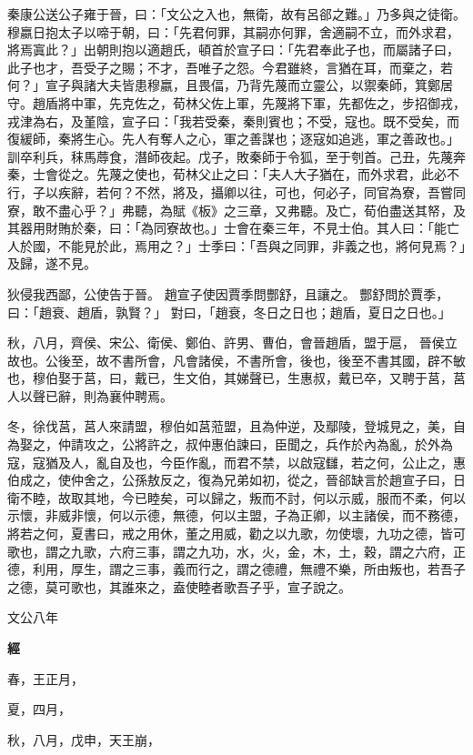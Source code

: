 \documentclass{ctexart}
\begin{document}
秦康公送公子雍于晉，曰：「文公之入也，無衛，故有呂郤之難。」乃多與之徒衛。穆嬴日抱太子以啼于朝，曰：「先君何罪，其嗣亦何罪，舍適嗣不立，而外求君，將焉寘此？」出朝則抱以適趙氏，頓首於宣子曰：「先君奉此子也，而屬諸子曰，此子也才，吾受子之賜；不才，吾唯子之怨。今君雖終，言猶在耳，而棄之，若何？」宣子與諸大夫皆患穆嬴，且畏偪，乃背先蔑而立靈公，以禦秦師，箕鄭居守。趙盾將中軍，先克佐之，荀林父佐上軍，先蔑將下軍，先都佐之，步招御戎，戎津為右，及堇陰，宣子曰：「我若受秦，秦則賓也；不受，寇也。既不受矣，而復緩師，秦將生心。先人有奪人之心，軍之善謀也；逐寇如追逃，軍之善政也。」訓卒利兵，秣馬蓐食，潛師夜起。戊子，敗秦師于令狐，至于刳首。己丑，先蔑奔秦，士會從之。先蔑之使也，荀林父止之曰：「夫人大子猶在，而外求君，此必不行，子以疾辭，若何？不然，將及，攝卿以往，可也，何必子，同官為寮，吾嘗同寮，敢不盡心乎？」弗聽，為賦《板》之三章，又弗聽。及亡，荀伯盡送其帑，及其器用財賄於秦，曰：「為同寮故也。」士會在秦三年，不見士伯。其人曰：「能亡人於國，不能見於此，焉用之？」士季曰：「吾與之同罪，非義之也，將何見焉？」及歸，遂不見。

狄侵我西鄙，公使告于晉。
趙宣子使因賈季問酆舒，且讓之。
酆舒問於賈季，曰：「趙衰、趙盾，孰賢？」
對曰，「趙衰，冬日之日也；趙盾，夏日之日也。」 

秋，八月，齊侯、宋公、衛侯、鄭伯、許男、曹伯，會晉趙盾，盟于扈，
晉侯立故也。公後至，故不書所會，凡會諸侯，不書所會，後也，後至不書其國，辟不敏也，穆伯娶于莒，曰，戴已，生文伯，其娣聲已，生惠叔，戴已卒，又聘于莒，莒人以聲已辭，則為襄仲聘焉。

冬，徐伐莒，莒人來請盟，穆伯如莒蒞盟，且為仲逆，及鄢陵，登城見之，美，自為娶之，仲請攻之，公將許之，叔仲惠伯諫曰，臣聞之，兵作於內為亂，於外為寇，寇猶及人，亂自及也，今臣作亂，而君不禁，以啟寇讎，若之何，公止之，惠伯成之，使仲舍之，公孫敖反之，復為兄弟如初，從之，晉郤缺言於趙宣子曰，日衛不睦，故取其地，今已睦矣，可以歸之，叛而不討，何以示威，服而不柔，何以示懷，非威非懷，何以示德，無德，何以主盟，子為正卿，以主諸侯，而不務德，將若之何，夏書曰，戒之用休，董之用威，勸之以九歌，勿使壞，九功之德，皆可歌也，謂之九歌，六府三事，謂之九功，水，火，金，木，土，穀，謂之六府，正德，利用，厚生，謂之三事，義而行之，謂之德禮，無禮不樂，所由叛也，若吾子之德，莫可歌也，其誰來之，盍使睦者歌吾子乎，宣子說之。 




文公八年


\textbf{經}



春，王正月，

夏，四月，

秋，八月，戊申，天王崩，
\end{document}
